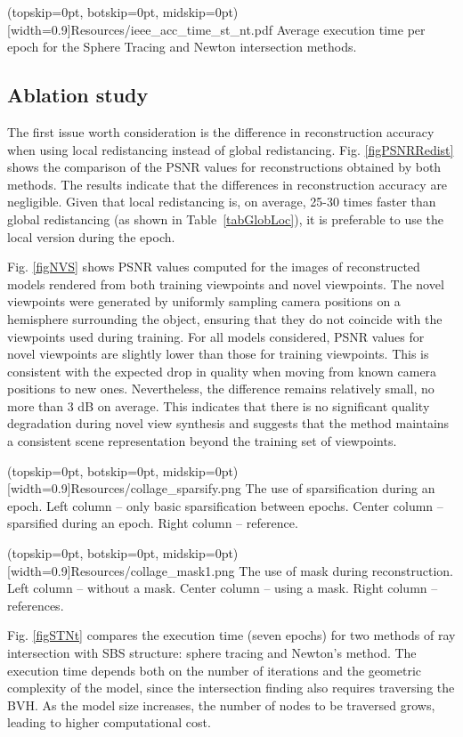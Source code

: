 \documentclass{ieeeaccess}
\begin{document}
\Figure[t](topskip=0pt, botskip=0pt, midskip=0pt)[width=0.9\linewidth]{Resources/ieee_acc_time_st_nt.pdf}{
    Average execution time per epoch for the Sphere Tracing and Newton intersection methods.\label{figSTNt}
}

\subsection{Ablation study}

The first issue worth consideration is the difference in reconstruction accuracy when using local redistancing instead of global redistancing. Fig. \ref{figPSNRRedist} shows the comparison of the PSNR values for reconstructions obtained by both methods. The results indicate that the differences in reconstruction accuracy are negligible. Given that local redistancing is, on average, 25-30 times faster than global redistancing (as shown in Table~\ref{tabGlobLoc}), it is preferable to use the local version during the epoch.

Fig. \ref{figNVS} shows PSNR values computed for the images of reconstructed models rendered from both training viewpoints and novel viewpoints. The novel viewpoints were generated by uniformly sampling camera positions on a hemisphere surrounding the object, ensuring that they do not coincide with the viewpoints used during training. For all models considered, PSNR values for novel viewpoints are slightly lower than those for training viewpoints. This is consistent with the expected drop in quality when moving from known camera positions to new ones. Nevertheless, the difference remains relatively small, no more than 3 dB on average. This indicates that there is no significant quality degradation during novel view synthesis and suggests that the method maintains a consistent scene representation beyond the training set of viewpoints.

\Figure[htbp](topskip=0pt, botskip=0pt, midskip=0pt)[width=0.9\linewidth]{Resources/collage_sparsify.png} {
    The use of sparsification during an epoch. Left column -- only basic sparsification between epochs. Center column -- sparsified during an epoch. Right column -- reference. \label{figAblSparsify}
}

\Figure[htbp](topskip=0pt, botskip=0pt, midskip=0pt)[width=0.9\linewidth]{Resources/collage_mask1.png} {
    The use of mask during reconstruction. Left column -- without a mask. Center column -- using a mask. Right column -- references. \label{figAblMask}
}

Fig. \ref{figSTNt} compares the execution time (seven epochs) for two methods of ray intersection with SBS structure: sphere tracing and Newton's method. The execution time depends both on the number of iterations and the geometric complexity of the model, since the intersection finding also requires traversing the BVH. As the model size increases, the number of nodes to be traversed grows, leading to higher computational cost.
\end{document}
